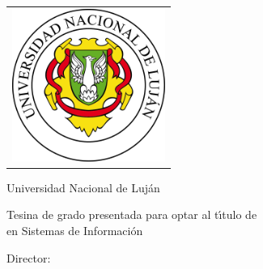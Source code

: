 \newcommand{\HRule}{\rule{\linewidth}{0.2mm}}
%
\thispagestyle{empty}

\begin{center}\leavevmode

	\vspace{-2cm}

	\begin{tabular}{l}
		\includegraphics[width=5cm]{img/logo_unlu.png}
	\end{tabular}

	{\large \sc Universidad Nacional de Luján}

	\vspace{5.0cm}

	{\huge\bf \tituloTesis}

	\vspace{2cm}

	{\large Tesina de grado presentada para optar al t\'{\i}tulo de\\
	\titulo en Sistemas de Informaci\'on}

	\vspace{2cm}

	{\Large \autor}

\end{center}

\vfill

{\large

	{Director: \director}

	\vspace{.2cm}

	\begin{center}
		\fecha
	\end{center}
}

\newpage\thispagestyle{empty}
